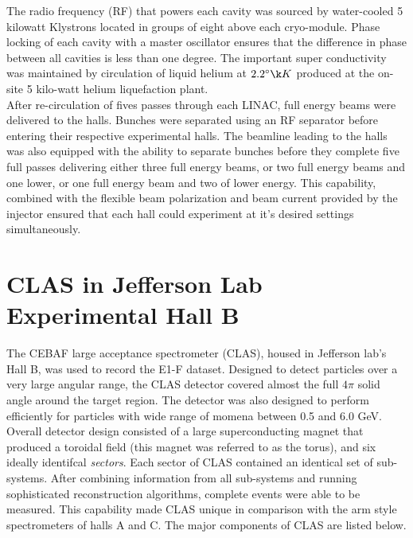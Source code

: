 The radio frequency (RF) that powers each cavity was sourced by water-cooled 5 kilowatt Klystrons located in groups of eight above each cryo-module.  Phase locking of each cavity with a master oscillator ensures that the difference in phase between all cavities is less than one degree. The important super conductivity was maintained by circulation of liquid helium at $2.2^\circ \k K$ produced at the on-site 5 kilo-watt helium liquefaction plant.  \\

After re-circulation of fives passes through each LINAC, full energy beams were delivered to the halls.  Bunches were separated using an RF separator before entering their respective experimental halls.  The beamline leading to the halls was also equipped with the ability to separate bunches before they complete five full passes delivering either three full energy beams, or two full energy beams and one lower, or one full energy beam and two of lower energy.  This capability, combined with the flexible beam polarization and beam current provided by the injector ensured that each hall could experiment at it's desired settings simultaneously.  

\section{CLAS in Jefferson Lab Experimental Hall B}
The CEBAF large acceptance spectrometer (CLAS), housed in Jefferson lab's Hall B, was used to record the E1-F dataset.  Designed to detect particles over a very large angular range, the CLAS detector covered almost the full $4\pi$ solid angle around the target region.  The detector was also designed to perform efficiently for particles with wide range of momena between 0.5 and 6.0 GeV.  Overall detector design consisted of a large superconducting magnet that produced a toroidal field (this magnet was referred to as the torus), and six ideally identifcal \textit{sectors}.  Each sector of CLAS contained an identical set of sub-systems.  After combining information from all sub-systems and running sophisticated reconstruction algorithms, complete events were able to be measured.  This capability made CLAS unique in comparison with the arm style spectrometers of halls A and C.  The major components of CLAS are listed below.


